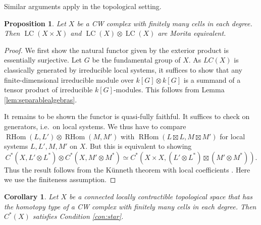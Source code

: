 \documentclass[a4paper]{amsart}
\theoremstyle{plain}
\newtheorem{prop}[thm]{Proposition}
\newtheorem{cor}[thm]{Corollary}
\theoremstyle{definition}
\theoremstyle{remark}
\DeclareMathOperator{\LC}{LC}
\DeclareMathOperator{\RHom}{RHom}
\numberwithin{equation}{section}
\theoremstyle{plain}
\begin{document}
	
Similar arguments apply in the topological setting.
	\begin{prop}\label{prop:lcmult}
		Let $X$ be a CW complex with finitely many cells in each degree. Then $\LC(X 
		\times X)$ and $\LC(X) \otimes \LC(X)$ are Morita equivalent.
	\end{prop}
	\begin{proof}
		We first show the natural functor given by the exterior product is essentially surjective. Let $G$ be the fundamental group of $X$. As $LC(X)$ is classically generated by irreducible local systems, it suffices to show that any finite-dimensional irreducible module over $k[G] \otimes k[G]$ is a summand of a tensor product of irreducible $k[G]$-modules. This follows from Lemma \ref{lem:separablealgebras}.
		
		It remains to be shown the functor is quasi-fully faithful. It suffices to check on generators, i.e.\ on local systems. 
		We thus have to compare
		$\RHom(L, L') \otimes \RHom(M, M')$ with $\RHom(L \boxtimes L, M \boxtimes M')$ for local systems $L,L', M, M'$ on $X$.
		But this is equivalent to showing
		$$C^*(X, L' \otimes L^*) \otimes C^*(X, M' \otimes M^*) \simeq C^*(X \times X, (L' \otimes L^*)\boxtimes (M' \otimes M^*)).$$
		Thus the result follows from the K\"unneth theorem with local coefficients \cite[Theorem 1.7]{Greenblatt06}. Here we use the finiteness assumption. 
	\end{proof}
	\begin{cor}
		Let $X$ be a connected locally contractible topological space that has the homotopy type of a CW complex with finitely many cells in each degree. Then $C^*(X)$ satisfies Condition \ref{con:star}.
	\end{cor}
\end{document}
